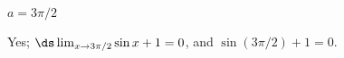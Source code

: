 {\noindent $a = 3\pi/2$

}
{Yes; $\ds \lim_{x\to 3\pi/2} \sin x +1 = 0$, and $\sin(3\pi/2)+1 = 0$.}
